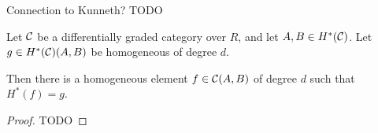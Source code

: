 \begin{remark}
    Connection to Kunneth? TODO




                        
\end{remark}

\begin{lemma}
    \label{lem:massey_product_in_dg_cat/massey_product_definition/exist_lifting_h_star}
    Let \( {\mathcal{C}} \) be a differentially graded category over \( R \), and let \( A, B \in H^*({\mathcal{C}}) \). Let \( g \in H^*({\mathcal{C}})(A, B) \) be homogeneous of degree \( d \).

    Then there is a homogeneous element \( f \in {\mathcal{C}}(A, B) \) of degree \( d \) such that \( H^*(f) = g \).
\end{lemma}
\begin{proof}
    TODO
\end{proof}

